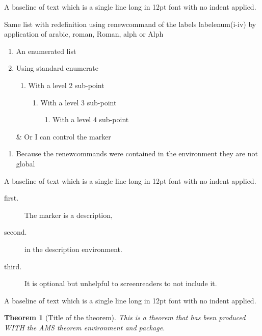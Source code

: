 \documentclass[12pt,a4paper]{article}
\theoremstyle{clearprint}
\newtheorem{theorem}{Theorem}[section]
\begin{document}
\noindent
A baseline of text which is a single line long in 12pt font with no indent applied.

Same list with redefinition using renewcommand of the labels labelenum(i-iv) by application of arabic, roman, Roman, alph or Alph
\begin{enumerate}
\renewcommand{\labelenumi}{\Roman{enumi}.}
\renewcommand{\labelenumii}{\roman{enumii}.}
\renewcommand{\labelenumiii}{\Alph{enumiii}.}
\renewcommand{\labelenumiv}{\alph{enumiv}.}
\item An enumerated list
\item Using standard enumerate
\begin{enumerate}
\item With a level 2 sub-point
\begin{enumerate}
\item With a level 3 sub-point
\begin{enumerate}
\item With a level 4 sub-point
\end{enumerate}
\end{enumerate}
\end{enumerate}
\item[\&] Or I can control the marker
\end{enumerate}

\begin{enumerate}
\item Because the renewcommands were contained in the environment they are not global
\end{enumerate}

\noindent
A baseline of text which is a single line long in 12pt font with no indent applied.

\begin{description}
\item[first.] The marker is a description,
\item[second.] in the description environment.
\item[third.] It is optional but unhelpful to screenreaders to not include it. 
\end{description}


\noindent
A baseline of text which is a single line long in 12pt font with no indent applied.

\begin{theorem}[Title of the theorem]
This is a theorem that has been produced WITH the AMS theorem environment and package.
\end{theorem}
\end{document}
